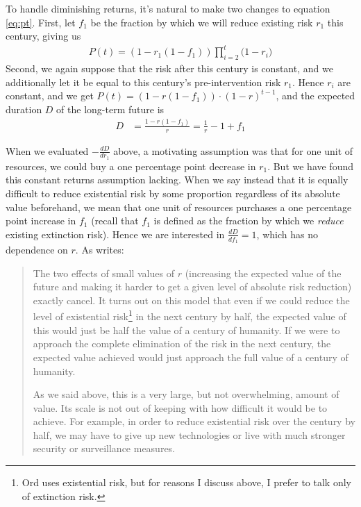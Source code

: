 \documentclass[british]{article}
\begin{document}
To handle diminishing returns, it's natural to make two changes to equation \ref{eq:pt}. First, let $f_1$ be the fraction by which we will reduce existing risk $r_1$ this century, giving us
\begin{align}
P(t) =  (1-r_1(1-f_1)) \prod_{i=2}^t {(1-r_i})\label{eq:dr}
\end{align}
Second, we again suppose that the risk after this century is constant, and we additionally let it be equal to this century's pre-intervention risk $r_1$. Hence $r_i$ are constant, and we get $P(t) = (1-r(1-f_1)) \cdot (1-r)^{t-1}$, and the expected duration $D$ of the long-term future is 
\begin{align*}
D &= \frac{1 - r(1 - f_1)}{r} = \frac{1}{r} -1 +f_1
\end{align*}

When we evaluated \(-\frac{dD}{dr_1}\) above, a motivating assumption
was that for one unit of resources, we could buy a one percentage point decrease in
\(r_1\). But we have found this constant returns assumption lacking. When we say instead that it is equally difficult to reduce existential
risk by some proportion regardless of its absolute value beforehand, we
mean that one unit of resources purchases a one percentage point increase in \(f_1\)
(recall that \(f_1\) is defined as the fraction by which we \emph{reduce}
existing extinction risk). Hence we are interested in $\frac{dD}{df_1}=1$, which has no dependence on \(r\). As \cite{ord_modelling_2014} writes:

\begin{quote}
The two effects of small values of \(r\) (increasing the expected value
of the future and making it harder to get a given level of absolute risk
reduction) exactly cancel. It turns out on this model that even if we
could reduce the level of existential risk\footnote{Ord uses existential risk, but for reasons I discuss above, I prefer to talk only of extinction risk.} in the next century by half, the expected value of this would just be half the value of a century of
humanity. If we were to approach the complete elimination of the risk in
the next century, the expected value achieved would just approach the
full value of a century of humanity.

As we said above, this is a very large, but not overwhelming, amount of
value. Its scale is not out of keeping with how difficult it would be to
achieve. For example, in order to reduce existential risk over the
century by half, we may have to give up new technologies or live with
much stronger security or surveillance measures.
\end{quote}
\end{document}
